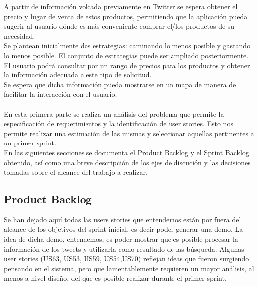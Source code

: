 \documentclass[a4paper,8pt]{article}
\begin{document}
A partir de información volcada previamente en Twitter se espera obtener el precio y lugar de venta de estos productos, permitiendo que la aplicación pueda sugerir al usuario dónde es más conveniente comprar el/los productos de su necesidad.\\

Se plantean inicialmente dos estrategias: caminando lo menos posible y gastando lo menos posible. El conjunto de estrategias puede ser ampliado posteriormente.\\
El usuario podrá consultar por un rango de precios para los productos y obtener la información adecuada a este tipo de solicitud. \\

Se espera que dicha información pueda mostrarse en un mapa de manera de facilitar la interacción con el usuario.\\\\

En esta primera parte se realiza un análisis del problema que permite la especificación de requerimientos y la identificación de user stories. Esto nos permite realizar una estimación de las mismas y seleccionar aquellas pertinentes a un primer sprint.\\

En las siguientes secciones se documenta el Product Backlog y el Sprint Backlog obtenido, así como una breve descripción de los ejes de discución y las decisiones tomadas sobre el alcance del trabajo a realizar.\\



\newpage
\subsection{Product Backlog}
Se han dejado aquí todas las users stories que entendemos están por fuera del alcance de los objetivos del sprint inicial, es decir poder generar una demo. La idea de dicha demo, entendemos, es poder mostrar que es posible procesar la información de los tweets y utilizarla como resultado de las búsqueda.
Algunas user stories (US63, US53, US59, US54,US70) reflejan ideas que fueron surgiendo pensando en el sistema, pero que lamentablemente requieren un mayor análisis, al menos a nivel diseño, del que es posible realizar durante el primer sprint. 
\end{document}

